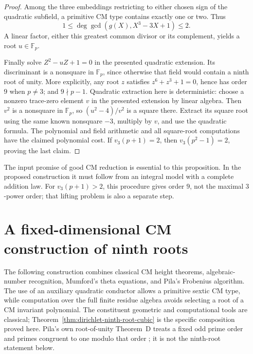 \documentclass[11pt]{article}
\theoremstyle{definition}
\theoremstyle{remark}
\begin{document}
\begin{proof}
Among the three embeddings restricting to either chosen sign of
the quadratic subfield, a primitive CM type contains exactly one
or two. Thus
\[
 1\leq\deg\gcd(g(X),X^3-3X+1)\leq2.
\]
A linear factor, either this greatest common divisor or its
complement, yields a root \(u\in\mathbb F_p\).

Finally solve \(Z^2-uZ+1=0\) in the presented quadratic extension.
Its discriminant is a nonsquare in \(\mathbb F_p\), since otherwise
that field would contain a ninth root of unity. More explicitly,
any root \(z\) satisfies \(z^6+z^3+1=0\), hence has order \(9\)
when \(p\ne3\); and \(9\nmid p-1\).
Quadratic extraction here is deterministic: choose a nonzero
trace-zero element \(v\) in the presented extension by linear
algebra. Then \(v^2\) is a nonsquare in \(\mathbb F_p\), so
\((u^2-4)/v^2\) is a square there. Extract its square root using
the same known nonsquare \(-3\), multiply by \(v\), and use the
quadratic formula. The polynomial and field arithmetic and all
square-root computations have the claimed polynomial cost.
If \(v_3(p+1)=2\), then \(v_3(p^2-1)=2\), proving the last claim.
\end{proof}

The input promise of good CM reduction is essential to this
proposition. In the proposed construction it must follow from
an integral model with a complete addition law. For
\(v_3(p+1)>2\), this procedure gives order \(9\), not the maximal
\(3\)-power order; that lifting problem is also a separate step.

\section{A fixed-dimensional CM construction of ninth roots}
\label{sec:composed-cubic-cm}

The following construction combines classical CM height theorems,
algebraic-number recognition, Mumford's theta equations, and Pila's
Frobenius algorithm. The use of an auxiliary quadratic conductor
allows a primitive sextic CM type, while computation over the full
finite residue algebra avoids selecting a root of a CM invariant
polynomial. The constituent geometric and computational tools are
classical; Theorem~\ref{thm:dirichlet-ninth-root-cubic} is the specific composition proved
here. Pila's own root-of-unity
Theorem~D treats a fixed odd prime order and primes congruent to
one modulo that order \citep[Theorem~D, author p.~2; Section~5, pp.~14--18]{Pila1990}; it is not the
ninth-root statement below.
\end{document}
